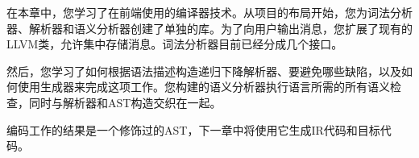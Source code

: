 在本章中，您学习了在前端使用的编译器技术。从项目的布局开始，您为词法分析器、解析器和语义分析器创建了单独的库。为了向用户输出消息，您扩展了现有的LLVM类，允许集中存储消息。词法分析器目前已经分成几个接口。\par

然后，您学习了如何根据语法描述构造递归下降解析器、要避免哪些缺陷，以及如何使用生成器来完成这项工作。您构建的语义分析器执行语言所需的所有语义检查，同时与解析器和AST构造交织在一起。\par

编码工作的结果是一个修饰过的AST，下一章中将使用它生成IR代码和目标代码。\par

\newpage